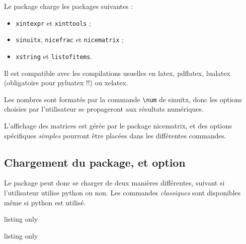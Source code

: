 \documentclass[a4paper,11pt]{article}
\begin{document}
\begin{noteblock}
Le package charge les packages suivantes :

\begin{itemize}
	\item \texttt{xintexpr} et \texttt{xinttools} ;
	\item \texttt{sinuitx}, \texttt{nicefrac} et \texttt{nicematrix} ;
	\item \texttt{xstring} et \texttt{listofitems}.
\end{itemize}

Il est compatible avec les compilations usuelles en \textsf{latex}, \textsf{pdflatex}, \textsf{lualatex} (obligatoire pour \textsf{pyluatex} !!) ou \textsf{xelatex}.
\end{noteblock}

\begin{importantblock}
Les nombres sont formatés par la commande \texttt{\textbackslash num} de \textsf{sinuitx}, donc les options choisies par l'utilisateur se propageront aux résultats numériques.

\smallskip

L'affichage des matrices est gérée par le package \textsf{nicematrix}, et des options spécifiques \textit{simples} pourront être placées dans les différentes commandes.
\end{importantblock}

\subsection{Chargement du package, et option}

\begin{importantblock}
Le package peut donc se charger de deux manières différentes, suivant si l'utilisateur utilise \textsf{python} ou non. Les commandes \textit{classiques} sont disponibles même si \textsf{python} est utilisé.
\end{importantblock}

\begin{PresentationCode}{listing only}
\usepackage{ResolSysteme}
\end{PresentationCode}

\begin{PresentationCode}{listing only}
\usepackage[options]{pyluatex}
\usepackage[pyluatex]{ResolSysteme}
\end{PresentationCode}
\end{document}
